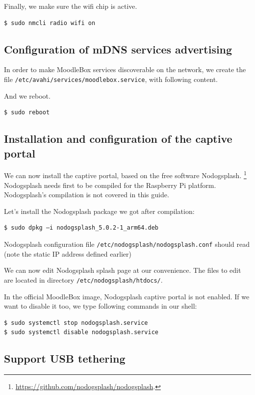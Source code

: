 \documentclass[12pt]{article}
\begin{document}
Finally, we make sure the wifi chip is active.
\begin{lstlisting}[language=bash]
$ sudo nmcli radio wifi on
\end{lstlisting}

\subsection{Configuration of mDNS services advertising}

In order to make MoodleBox services discoverable on the network, we create the file \lstinline{/etc/avahi/services/moodlebox.service}, with following content.


And we reboot.
\begin{lstlisting}[language=bash]
$ sudo reboot
\end{lstlisting}

\subsection{Installation and configuration of the captive portal}

We can now install the captive portal, based on the free software Nodogsplash.%
\footnote{\url{https://github.com/nodogsplash/nodogsplash}.}
Nodogsplash needs first to be compiled for the Raspberry Pi platform.
Nodogsplash's compilation is not covered in this guide.

Let's install the Nodogsplash package we got after compilation:
\begin{lstlisting}[language=bash]
$ sudo dpkg –i nodogsplash_5.0.2-1_arm64.deb
\end{lstlisting}
Nodogsplash configuration file \lstinline{/etc/nodogsplash/nodogsplash.conf} should read (note the static IP address defined earlier)


We can now edit Nodogsplash splash page at our convenience.
The files to edit are located in directory \lstinline{/etc/nodogsplash/htdocs/}.

In the official MoodleBox image, Nodogsplash captive portal is not enabled.
If we want to disable it too, we type following commands in our shell:
\begin{lstlisting}[language=bash]
$ sudo systemctl stop nodogsplash.service
$ sudo systemctl disable nodogsplash.service
\end{lstlisting}

\subsection{Support USB tethering}
\end{document}
